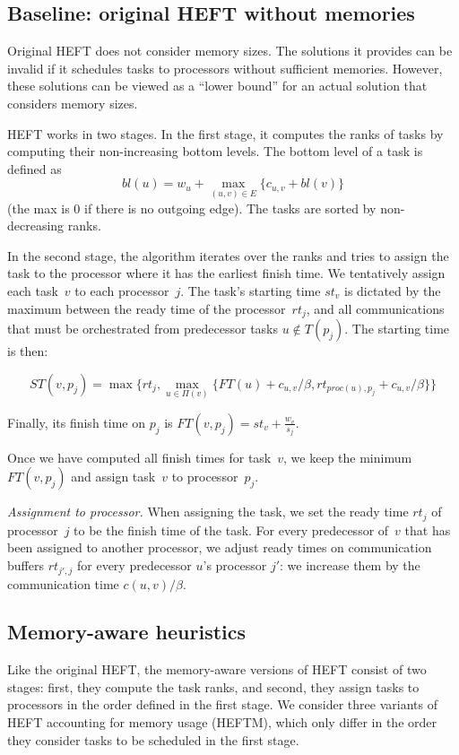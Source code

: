\documentclass[conference]{IEEEtran}
\begin{document}
    \subsection{Baseline: original HEFT without memories}
\label{sec.heft}

    Original HEFT does not consider memory sizes.
    The solutions it provides can be invalid if it schedules tasks to processors without sufficient memories.
    However, these solutions can be viewed as a ``lower bound'' for an actual solution that considers memory sizes.

    HEFT works in two stages.
    In the first stage, it computes the ranks of tasks by computing their non-increasing bottom levels.
    The bottom level of a task is defined as
    $$bl(u) = w_u + \max_{(u,v)\in E} \{c_{u,v} + bl(v)\}$$
    (the max is 0 if there is no outgoing edge).
    The tasks are sorted by non-decreasing ranks.

    In the second stage, the algorithm iterates over the ranks and tries to assign the task to the processor where it
    has the earliest finish time.
    We tentatively assign each task~$v$ to each processor~$j$.
    The task's starting time $st_v$ is dictated by the maximum between the ready time of the processor~$rt_j$,
    and all communications that
    must be orchestrated from predecessor tasks $u\notin T(p_j)$.
    The starting time is then:

 {\footnotesize{   \[ST(v, p_j) = \max{ \{rt_j, \max_{ u \in \Pi(v)}\{ FT(u)+ c_{u,v} / \beta , rt_{proc(u), p_j} + c_{u,v} / \beta  \} \} } \]}}

    Finally, its finish time on $p_j$ is
    $FT(v,p_j) = st_v + \frac{w_v}{s_j}$.

    Once we have computed all finish times for task~$v$,
    we keep the minimum $FT(v,p_j)$ and assign task~$v$
    to processor~$p_j$.

    \textit{Assignment to processor. }
    When assigning the task, we set the ready time $rt_j$ of  processor~$j$ to be the finish time of the task.
    For every predecessor of~$v$ that has been assigned to another processor, we adjust ready times on
    communication buffers $rt_{j', j}$ for every predecessor $u$'s processor $j'$: we increase them by the
    communication time $c( u,v) / \beta$.

    \subsection{Memory-aware heuristics}
    \label{sec.heftm}
    Like the original HEFT, the memory-aware versions of HEFT consist of two stages:
    first, they compute the task ranks,
    and second, they assign tasks to processors in the order defined in the first stage.
    We consider three variants of HEFT accounting for memory usage (HEFTM), which only
    differ in the order they consider tasks to be scheduled in the first stage.
\end{document}
